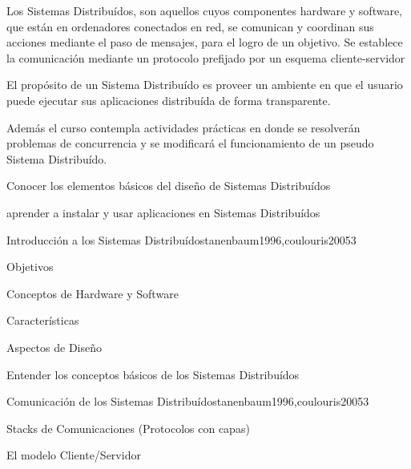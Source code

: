 \begin{syllabus}


\begin{justification}
Los Sistemas Distribuídos, son aquellos cuyos componentes hardware y software, que están en ordenadores conectados en red, se comunican y coordinan sus acciones mediante el paso de mensajes, para el logro de un objetivo. Se establece la comunicación mediante un protocolo prefijado por un esquema cliente-servidor

El propósito de un Sistema Distribuído es proveer un ambiente en que el usuario puede ejecutar sus aplicaciones distribuída de forma transparente.

Además el curso contempla actividades prácticas en donde se resolverán problemas de concurrencia y se modificará el funcionamiento de un pseudo Sistema Distribuído.
\end{justification}

\begin{goals}
\item Conocer los elementos básicos del diseño de Sistemas Distribuídos
\item aprender a instalar y usar aplicaciones en Sistemas Distribuídos
\end{goals}

\begin{outcomes}
\end{outcomes}

\begin{unit}{Introducción a los Sistemas Distribuídos}{tanenbaum1996,coulouris2005}{3}
   \begin{topics}
      \item Objetivos
      \item Conceptos de Hardware y Software
      \item Características
      \item Aspectos de Diseño
   \end{topics}

   \begin{unitgoals}
      \item Entender los conceptos básicos de los Sistemas Distribuídos
   \end{unitgoals}
\end{unit}

\begin{unit}{Comunicación de los Sistemas Distribuídos}{tanenbaum1996,coulouris2005}{3}
   \begin{topics}
      \item Stacks de Comunicaciones (Protocolos con capas)
      \item El modelo Cliente/Servidor
   \end{topics}


\end{unit}
\end{syllabus}
